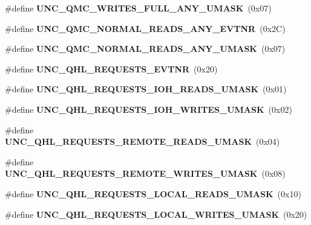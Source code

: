 \begin{DoxyCompactItemize}
\item 
\#define {\bfseries U\+N\+C\+\_\+\+Q\+M\+C\+\_\+\+W\+R\+I\+T\+E\+S\+\_\+\+F\+U\+L\+L\+\_\+\+A\+N\+Y\+\_\+\+U\+M\+A\+SK}~(0x07)\label{types_8h_a9dd4b0b4cf1bb831b9e34773c59dbeed}

\item 
\#define {\bfseries U\+N\+C\+\_\+\+Q\+M\+C\+\_\+\+N\+O\+R\+M\+A\+L\+\_\+\+R\+E\+A\+D\+S\+\_\+\+A\+N\+Y\+\_\+\+E\+V\+T\+NR}~(0x2\+C)\label{types_8h_a097baf5419e07e930219946420c0e257}

\item 
\#define {\bfseries U\+N\+C\+\_\+\+Q\+M\+C\+\_\+\+N\+O\+R\+M\+A\+L\+\_\+\+R\+E\+A\+D\+S\+\_\+\+A\+N\+Y\+\_\+\+U\+M\+A\+SK}~(0x07)\label{types_8h_a386070eca92af21fadab353ab255fe75}

\item 
\#define {\bfseries U\+N\+C\+\_\+\+Q\+H\+L\+\_\+\+R\+E\+Q\+U\+E\+S\+T\+S\+\_\+\+E\+V\+T\+NR}~(0x20)\label{types_8h_a73f427253368afcb09bdc9e014beb78b}

\item 
\#define {\bfseries U\+N\+C\+\_\+\+Q\+H\+L\+\_\+\+R\+E\+Q\+U\+E\+S\+T\+S\+\_\+\+I\+O\+H\+\_\+\+R\+E\+A\+D\+S\+\_\+\+U\+M\+A\+SK}~(0x01)\label{types_8h_af8e9aeb55fcaf7733e59b551e9f2e78e}

\item 
\#define {\bfseries U\+N\+C\+\_\+\+Q\+H\+L\+\_\+\+R\+E\+Q\+U\+E\+S\+T\+S\+\_\+\+I\+O\+H\+\_\+\+W\+R\+I\+T\+E\+S\+\_\+\+U\+M\+A\+SK}~(0x02)\label{types_8h_abe67ec964875ae4eaa22e667cbac2b32}

\item 
\#define {\bfseries U\+N\+C\+\_\+\+Q\+H\+L\+\_\+\+R\+E\+Q\+U\+E\+S\+T\+S\+\_\+\+R\+E\+M\+O\+T\+E\+\_\+\+R\+E\+A\+D\+S\+\_\+\+U\+M\+A\+SK}~(0x04)\label{types_8h_a03ea6ce36511244b92f7f28133fddf2d}

\item 
\#define {\bfseries U\+N\+C\+\_\+\+Q\+H\+L\+\_\+\+R\+E\+Q\+U\+E\+S\+T\+S\+\_\+\+R\+E\+M\+O\+T\+E\+\_\+\+W\+R\+I\+T\+E\+S\+\_\+\+U\+M\+A\+SK}~(0x08)\label{types_8h_ab0077e2742a89d3f5062e758ad3bea32}

\item 
\#define {\bfseries U\+N\+C\+\_\+\+Q\+H\+L\+\_\+\+R\+E\+Q\+U\+E\+S\+T\+S\+\_\+\+L\+O\+C\+A\+L\+\_\+\+R\+E\+A\+D\+S\+\_\+\+U\+M\+A\+SK}~(0x10)\label{types_8h_aa49807e82cc1bb3a4f4d183ca67f3d07}

\item 
\#define {\bfseries U\+N\+C\+\_\+\+Q\+H\+L\+\_\+\+R\+E\+Q\+U\+E\+S\+T\+S\+\_\+\+L\+O\+C\+A\+L\+\_\+\+W\+R\+I\+T\+E\+S\+\_\+\+U\+M\+A\+SK}~(0x20)\label{types_8h_a03c56b60d268ae31c7d5c3186dd9eca1}


\end{DoxyCompactItemize}
